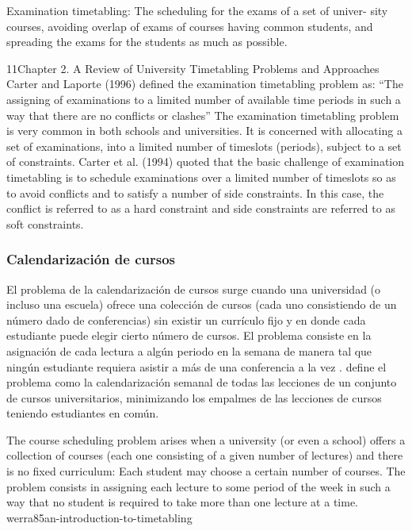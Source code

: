 \documentclass[draft,12pt,headsepline,footsepline,paper=letter]{scrreprt}
\begin{document}
Examination timetabling: The scheduling for the exams of a set of univer- sity courses, avoiding overlap of exams of courses having common students, and spreading the exams for the students as much as possible.

11Chapter 2. A Review of University Timetabling Problems and Approaches
Carter and Laporte (1996) defined the examination timetabling problem as:
“The assigning of examinations to a limited number of available time periods in such a way that there are no conflicts or clashes”
The examination timetabling problem is very common in both schools and universities. It is concerned with allocating a set of examinations, into a limited number of timeslots (periods), subject to a set of constraints. Carter et al. (1994) quoted that the basic challenge of examination timetabling is to schedule examinations over a limited number of timeslots so as to avoid conflicts and to satisfy a number of side constraints. In this case, the conflict is referred to as a hard constraint and side constraints are referred to as soft constraints.
\fi

\subsubsection{Calendarización de cursos}

El problema de la calendarización de cursos surge cuando una universidad (o incluso una escuela) ofrece una colección de cursos (cada uno consistiendo de un número dado de conferencias) sin existir un currículo fijo y en donde cada estudiante puede elegir cierto número de cursos. El problema consiste en la asignación de cada lectura a algún periodo en la semana de manera tal que ningún estudiante requiera asistir a más de una conferencia a la vez \citep[p.~157]{werra85an-introduction-to-timetabling}.
\citet[p.~88]{schaerf99a-survey-of-automated} define el problema como la calendarización semanal de todas las lecciones de un conjunto de cursos universitarios, minimizando los empalmes de las lecciones de cursos teniendo estudiantes en común.

\iffalse
The course scheduling problem arises when a university (or even a school) offers a collection of courses (each one consisting of a given number of lectures) and there is no fixed curriculum: Each student may choose a certain number of courses. The problem consists in assigning each lecture to some period of the week in such a way that no student is required to take more than one lecture at a time. {werra85an-introduction-to-timetabling}
\end{document}
